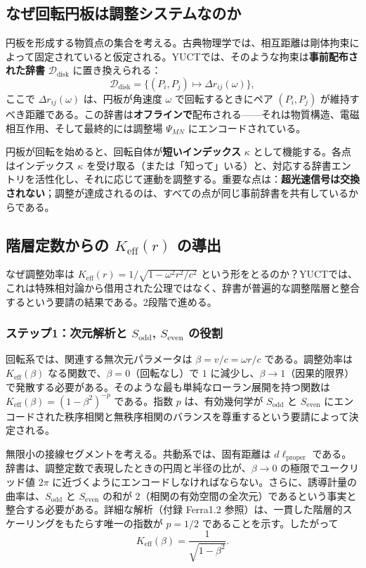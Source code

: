 \documentclass[12pt,a4paper]{article}
\newcommand{\Sodd}{S_{\mathrm{odd}}}
\newcommand{\Seven}{S_{\mathrm{even}}}
\begin{document}
	\subsection{なぜ回転円板は調整システムなのか}
	\label{subsec:disk-coordination}
	
	円板を形成する物質点の集合を考える。古典物理学では、相互距離は剛体拘束によって固定されていると仮定される。YUCTでは、そのような拘束は\textbf{事前配布された辞書} \(\mathcal{D}_{\text{disk}}\) に置き換えられる：
	\[
	\mathcal{D}_{\text{disk}} = \bigl\{ (P_i, P_j) \mapsto \Delta r_{ij}(\omega) \bigr\},
	\]
	ここで \(\Delta r_{ij}(\omega)\) は、円板が角速度 \(\omega\) で回転するときにペア \((P_i,P_j)\) が維持すべき距離である。この辞書は\textbf{オフラインで}配布される——それは物質構造、電磁相互作用、そして最終的には調整場 \(\Psi_{MN}\) にエンコードされている。
	
	円板が回転を始めると、回転自体が\textbf{短いインデックス} \(\kappa\) として機能する。各点はインデックス \(\kappa\) を受け取る（または「知って」いる）と、対応する辞書エントリを活性化し、それに応じて運動を調整する。重要な点は：\textbf{超光速信号は交換されない}；調整が達成されるのは、すべての点が同じ事前辞書を共有しているからである。
	
	\subsection{階層定数からの \(K_{\mathrm{eff}}(r)\) の導出}
	\label{subsec:keff-derivation}
	
	なぜ調整効率は \(K_{\mathrm{eff}}(r) = 1/\sqrt{1-\omega^2 r^2/c^2}\) という形をとるのか？YUCTでは、これは特殊相対論から借用された公理ではなく、辞書が普遍的な調整階層と整合するという要請の結果である。2段階で進める。
	
	\subsubsection{ステップ1：次元解析と \(\Sodd\), \(\Seven\) の役割}
	回転系では、関連する無次元パラメータは \(\beta = v/c = \omega r/c\) である。調整効率は \(K_{\mathrm{eff}}(\beta)\) なる関数で、\(\beta = 0\)（回転なし）で \(1\) に減少し、\(\beta \to 1\)（因果的限界）で発散する必要がある。そのような最も単純なローラン展開を持つ関数は \(K_{\mathrm{eff}}(\beta) = (1-\beta^2)^{-p}\) である。指数 \(p\) は、有効幾何学が \(\Sodd\) と \(\Seven\) にエンコードされた秩序相関と無秩序相関のバランスを尊重するという要請によって決定される。
	
	無限小の接線セグメントを考える。共動系では、固有距離は \(d\ell_{\text{proper}}\) である。辞書は、調整定数で表現したときの円周と半径の比が、\(\beta \to 0\) の極限でユークリッド値 \(2\pi\) に近づくようにエンコードしなければならない。さらに、誘導計量の曲率は、\(\Sodd\) と \(\Seven\) の和が \(2\)（相関の有効空間の全次元）であるという事実と整合する必要がある。詳細な解析（付録 Ferra1.2 参照）は、一貫した階層的スケーリングをもたらす唯一の指数が \(p = 1/2\) であることを示す。したがって
	\[
	K_{\mathrm{eff}}(\beta) = \frac{1}{\sqrt{1-\beta^2}}.
	\]
	
\end{document}
